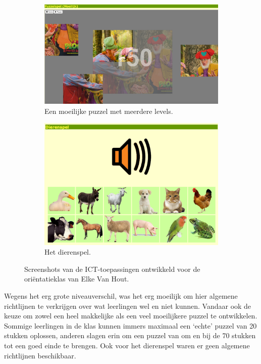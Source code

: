 \documentclass[a4paper,11pt]{article}
\theoremstyle{definition}
\begin{document}
\begin{itemize}
\begin{itemize}
\begin{figure}[h!]
\begin{subfigure}{.5\textwidth}
        \end{subfigure}%
        \begin{subfigure}{.5\textwidth}
           \centering
                \includegraphics[scale=0.085]{mpuzzel.jpg}
                \caption{Een moeilijke puzzel met meerdere levels.}
                \label{mpuzzel}
        \end{subfigure}
        \begin{subfigure}{1\textwidth}
           \centering
                \includegraphics[scale=0.15]{dieren.jpg}
                \caption{Het dierenspel.}
                \label{dieren}
        \end{subfigure}
           \caption{Screenshots van de ICT-toepassingen ontwikkeld voor de oriëntatieklas van Elke Van Hout.}
\end{figure}
Wegens het erg grote niveauverschil, was het erg moeilijk om hier algemene 
richtlijnen te verkrijgen over wat leerlingen wel en niet kunnen. Vandaar ook de 
keuze om zowel een heel makkelijke als een veel moeilijkere puzzel te 
ontwikkelen. Sommige leerlingen in de klas kunnen immers maximaal een `echte' puzzel van 
20 stukken oplossen, anderen slagen erin om een puzzel van om en bij de 70 
stukken tot een goed einde te brengen. Ook voor het dierenspel waren er geen 
algemene richtlijnen beschikbaar.\\


\end{itemize}
\end{itemize}
\end{document}
